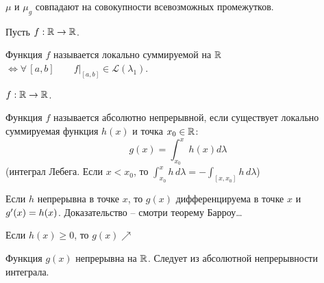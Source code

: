 $\mu$ и $\mu_g$ совпадают на совокупности всевозможных промежутков.


\begin{definition}
    Пусть $f: \mathbb{R} \to \mathbb{R}$.

    Функция $f$ называется локально суммируемой  на $\mathbb{R}$
    $\iff \forall \, [a,b]\quad\quad f\bigg|_{[a,b]} \in \mathcal{L} (\lambda_1)$. 
\end{definition}

\begin{definition}
    $f: \mathbb{R} \to \mathbb{R}$.
    
    Функция $f$ называется абсолютно непрерывной, если существует локально суммируемая функция $h(x)$ и точка $x_0\in \mathbb{R}$: \[g(x) = \int_{x_0}^x h(x)d\lambda\] 
    (интеграл Лебега. Если $x < x_0$, то $\int_{x_0}^x h\, d\lambda = - \int_{[x, x_0]}h\, d\lambda$)
    
    Если $h$ непрерывна в точке $x$, то $g(x)$ дифференцируема в точке $x$ и $g^{\prime}(x) = h(x)$. Доказательство  -- смотри теорему Барроу\ldots
    
    Если $h(x) \geqslant 0$, то $g(x)\nearrow $

    Функция $g(x)$ непрерывна на $\mathbb{R}$. Следует из абсолютной непрерывности интеграла.

\end{definition}
\endinput